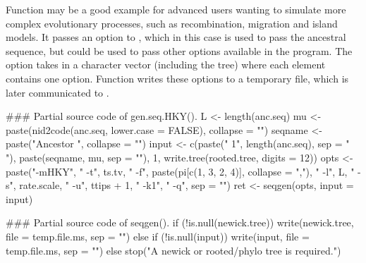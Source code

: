 Function  may be a good example
for advanced users wanting to simulate more complex evolutionary processes, such as recombination,
migration and island models. It passes an option  to
, which in this case is used to pass the ancestral sequence, but could be used to pass other
options available in the  program.
The option  takes in a character vector (including the tree)
where each element contains one  option.
Function  writes these options to
a temporary file, which is later communicated to .
\begin{Code}
### Partial source code of gen.seq.HKY().
        L <- length(anc.seq)
        mu <- paste(nid2code(anc.seq, lower.case = FALSE), collapse = "")
        seqname <- paste("Ancestor  ", collapse = "")
        input <- c(paste(" 1", length(anc.seq), sep = " "), paste(seqname, 
            mu, sep = ""), 1, write.tree(rooted.tree, digits = 12))
        opts <- paste("-mHKY", " -t", ts.tv, " -f", paste(pi[c(1, 
            3, 2, 4)], collapse = ","), " -l", L, " -s", rate.scale, 
            " -u", ttips + 1, " -k1", " -q", sep = "")
        ret <- seqgen(opts, input = input)

### Partial source code of seqgen().
        if (!is.null(newick.tree)) {
            write(newick.tree, file = temp.file.ms, sep = "")
        }
        else if (!is.null(input)) {
            write(input, file = temp.file.ms, sep = "\n")
        }
        else {
            stop("A newick or rooted/phylo tree is required.")
        }
\end{Code}

